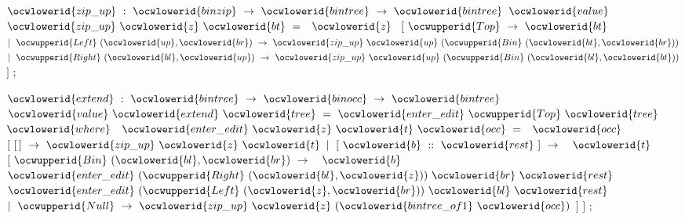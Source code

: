 \documentclass[12pt]{article}
\begin{document}
\ocwendcode{}\ocwindent{0.00em}
\ocwbegindcode{}$\ocwlowerid{zip\_up}~:~\ocwlowerid{binzip}~\rightarrow{}~\ocwlowerid{bintree}~\rightarrow{}~\ocwlowerid{bintree}$\ocwenddcode{} 
\ocweol
\label{../ML/bintree.ml:2093}%
\medskip
\ocwbegincode{}\ocwindent{0.00em}
$\ocwlowerid{value}~$~$\ocwlowerid{zip\_up}~\ocwlowerid{z}~\ocwlowerid{bt}~=~$~$\ocwlowerid{z}~$\ocweol
\ocwindent{1.00em}
$[~\ocwupperid{Top}~\rightarrow{}~\ocwlowerid{bt}~$\ocweol
\ocwindent{1.00em}
$\mid{}~\ocwupperid{Left}~(\ocwlowerid{up},\ocwlowerid{br})~\rightarrow{}~\ocwlowerid{zip\_up}~\ocwlowerid{up}~(\ocwupperid{Bin}~(\ocwlowerid{bt},\ocwlowerid{br}))$\ocweol
\ocwindent{1.00em}
$\mid{}~\ocwupperid{Right}~(\ocwlowerid{bl},\ocwlowerid{up})~\rightarrow{}~\ocwlowerid{zip\_up}~\ocwlowerid{up}~(\ocwupperid{Bin}~(\ocwlowerid{bl},\ocwlowerid{bt}))$\ocweol
\ocwindent{1.00em}
$]$\ocweol
\ocwindent{0.00em}
;\medskip

\ocwendcode{}\ocwindent{0.00em}
\ocwbegindcode{}$\ocwlowerid{extend}~:~\ocwlowerid{bintree}~\rightarrow{}~\ocwlowerid{binocc}~\rightarrow{}~\ocwlowerid{bintree}$\ocwenddcode{} 
\ocweol
\label{../ML/bintree.ml:2287}%
\medskip
\ocwbegincode{}\ocwindent{0.00em}
$\ocwlowerid{value}~\ocwlowerid{extend}~\ocwlowerid{tree}~=~\ocwlowerid{enter\_edit}~\ocwupperid{Top}~\ocwlowerid{tree}~$\ocweol
\ocwindent{1.00em}
$\ocwlowerid{where}~$~$\ocwlowerid{enter\_edit}~\ocwlowerid{z}~\ocwlowerid{t}~\ocwlowerid{occ}~=~$~$\ocwlowerid{occ}~$\ocweol
\ocwindent{2.50em}
$[~[\,]~\rightarrow{}~\ocwlowerid{zip\_up}~\ocwlowerid{z}~\ocwlowerid{t}$\ocweol
\ocwindent{2.50em}
$\mid{}~[~\ocwlowerid{b}~::~\ocwlowerid{rest}~]~\rightarrow{}~$~$\ocwlowerid{t}~$~\ocweol
\ocwindent{4.50em}
$[~\ocwupperid{Bin}~(\ocwlowerid{bl},\ocwlowerid{br})~\rightarrow{}~$~$\ocwlowerid{b}~$~$\ocwlowerid{enter\_edit}~(\ocwupperid{Right}~(\ocwlowerid{bl},\ocwlowerid{z}))~\ocwlowerid{br}~\ocwlowerid{rest}$\ocweol
\ocwindent{13.00em}
~$\ocwlowerid{enter\_edit}~(\ocwupperid{Left}~(\ocwlowerid{z},\ocwlowerid{br}))~\ocwlowerid{bl}~\ocwlowerid{rest}$\ocweol
\ocwindent{4.50em}
$\mid{}~\ocwupperid{Null}~\rightarrow{}~\ocwlowerid{zip\_up}~\ocwlowerid{z}~(\ocwlowerid{bintree\_of1}~\ocwlowerid{occ})$\ocweol
\ocwindent{4.50em}
$]$\ocweol
\ocwindent{2.50em}
$]$\ocweol
\ocwindent{0.00em}
;\medskip
\end{document}
